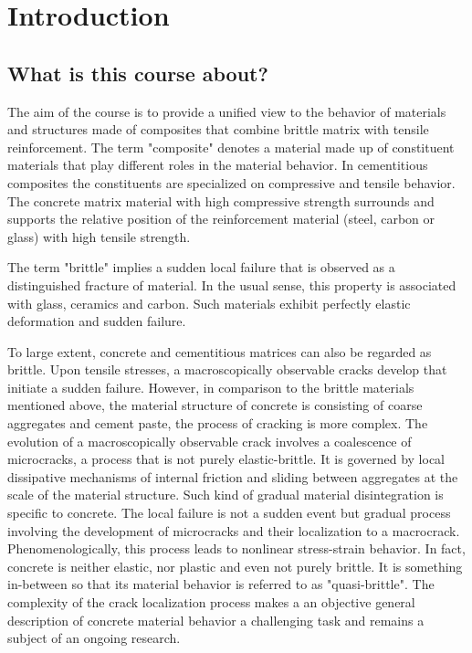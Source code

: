 \documentclass[main.tex]{subfiles}
\begin{document}
\chapter{Introduction}

\section{What is this course about?}

The aim of the course is to provide a unified view to the 
behavior of materials and structures made of composites that combine 
brittle matrix with tensile reinforcement.
The term "composite" denotes a material made up of constituent materials that play different roles in the material behavior.
In cementitious composites the constituents are specialized on compressive and tensile behavior.
The concrete matrix material with high compressive strength surrounds and supports the relative position of the reinforcement material (steel, carbon or glass) with high tensile strength.

The term "brittle" implies a 
sudden local failure that is observed as 
a distinguished fracture of material. In the usual sense, this property is associated 
with glass, ceramics and carbon. Such materials exhibit perfectly 
elastic deformation and sudden failure.

To large extent, concrete and cementitious matrices can also be regarded
as brittle. Upon tensile stresses, a macroscopically observable cracks develop 
that initiate a sudden failure. However, in comparison to the brittle materials
mentioned above, the material structure of concrete is consisting of coarse 
aggregates and cement paste, the process of cracking is more complex.
The evolution of a macroscopically observable crack involves a coalescence of  microcracks, a process that is not purely elastic-brittle. It is governed by local dissipative mechanisms of internal friction
and sliding between aggregates at the scale of the material structure.
Such kind of gradual material disintegration is specific to concrete.
The local failure is not a sudden event but gradual process 
involving the development of microcracks and their localization to a macrocrack.
Phenomenologically, this process leads to nonlinear stress-strain behavior. In fact, concrete is neither elastic, nor plastic and even not purely brittle.
It is something in-between so that its material behavior is  referred to as "quasi-brittle". 
The complexity of the crack localization process makes a
an objective general description of concrete material behavior a challenging task and remains a subject of an ongoing research.
\end{document}
